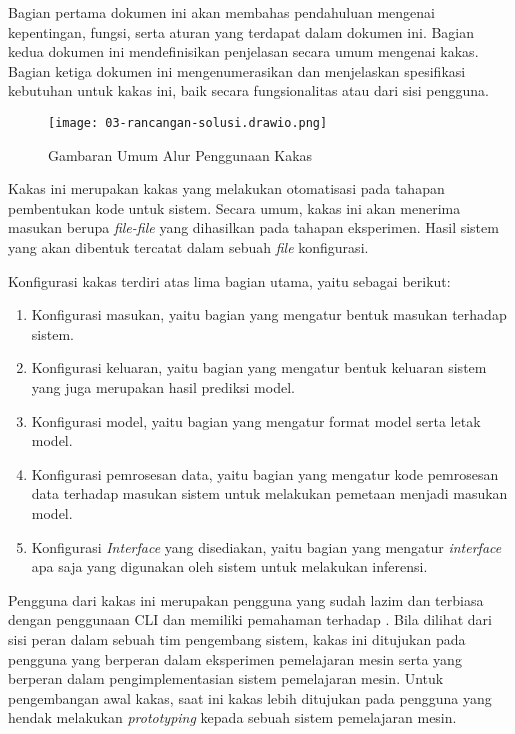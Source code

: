 Bagian pertama dokumen ini akan membahas pendahuluan mengenai kepentingan, fungsi, serta aturan yang terdapat dalam dokumen ini.
Bagian kedua dokumen ini mendefinisikan penjelasan secara umum mengenai kakas.
Bagian ketiga dokumen ini mengenumerasikan dan menjelaskan spesifikasi kebutuhan untuk kakas ini, baik secara fungsionalitas atau dari sisi pengguna.



\begin{figure}[ht]
    \centering
    \texttt{[image: 03-rancangan-solusi.drawio.png]}
    \caption{Gambaran Umum Alur Penggunaan Kakas}\label{fig:appendix-tool-design}
\end{figure}

Kakas ini merupakan kakas yang melakukan otomatisasi pada tahapan pembentukan kode untuk sistem.
Secara umum, kakas ini akan menerima masukan berupa \textit{file-file} yang dihasilkan pada tahapan eksperimen.
Hasil sistem yang akan dibentuk tercatat dalam sebuah \textit{file} konfigurasi.

Konfigurasi kakas terdiri atas lima bagian utama, yaitu sebagai berikut:

\begin{enumerate}
	\item Konfigurasi masukan, yaitu bagian yang mengatur bentuk masukan terhadap sistem.
	\item Konfigurasi keluaran, yaitu bagian yang mengatur bentuk keluaran sistem yang juga merupakan hasil prediksi model.
	\item Konfigurasi model, yaitu bagian yang mengatur format model serta letak model.
	\item Konfigurasi pemrosesan data, yaitu bagian yang mengatur kode pemrosesan data terhadap masukan sistem untuk melakukan pemetaan menjadi masukan model.
	\item Konfigurasi \textit{Interface} yang disediakan, yaitu bagian yang mengatur \textit{interface} apa saja yang digunakan oleh sistem untuk melakukan inferensi. 
\end{enumerate}


Pengguna dari kakas ini merupakan pengguna yang sudah lazim dan terbiasa dengan penggunaan CLI dan memiliki pemahaman terhadap .
Bila dilihat dari sisi peran dalam sebuah tim pengembang sistem, kakas ini ditujukan pada pengguna yang berperan dalam eksperimen pemelajaran mesin serta yang berperan dalam pengimplementasian sistem pemelajaran mesin.
Untuk pengembangan awal kakas, saat ini kakas lebih ditujukan pada pengguna yang hendak melakukan \textit{prototyping} kepada sebuah sistem pemelajaran mesin.


